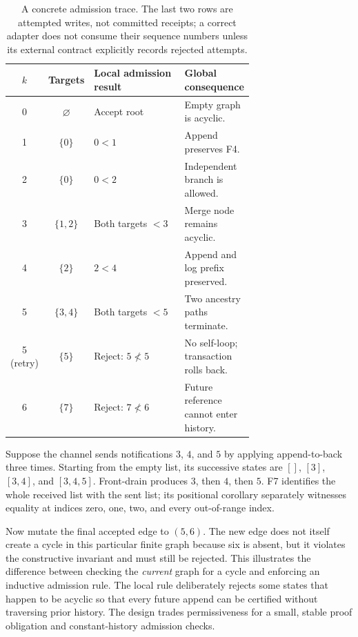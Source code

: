 \documentclass[11pt,letterpaper]{article}
\theoremstyle{definition}
\begin{document}
\begin{table}[h]
\centering
\small
\begin{tabular}{@{}ccp{0.42\linewidth}p{0.28\linewidth}@{}}
\toprule
$k$ & Targets & Local admission result & Global consequence \\
\midrule
0 & $\varnothing$ & Accept root & Empty graph is acyclic. \\
1 & $\{0\}$ & $0<1$ & Append preserves F4. \\
2 & $\{0\}$ & $0<2$ & Independent branch is allowed. \\
3 & $\{1,2\}$ & Both targets $<3$ & Merge node remains acyclic. \\
4 & $\{2\}$ & $2<4$ & Append and log prefix preserved. \\
5 & $\{3,4\}$ & Both targets $<5$ & Two ancestry paths terminate. \\
5 (retry) & $\{5\}$ & Reject: $5\not<5$ & No self-loop; transaction rolls back. \\
6 & $\{7\}$ & Reject: $7\not<6$ & Future reference cannot enter history. \\
\bottomrule
\end{tabular}
\caption{A concrete admission trace. The last two rows are attempted writes,
not committed receipts; a correct adapter does not consume their sequence
numbers unless its external contract explicitly records rejected attempts.}
\label{tab:trace}
\end{table}

Suppose the channel sends notifications $3$, $4$, and $5$ by applying
append-to-back three times. Starting from the empty list, its successive states
are $[]$, $[3]$, $[3,4]$, and $[3,4,5]$. Front-drain produces $3$, then $4$,
then $5$. F7 identifies the whole received list with the sent list; its
positional corollary separately witnesses equality at indices zero, one, two,
and every out-of-range index.

Now mutate the final accepted edge to $(5,6)$. The new edge does not itself
create a cycle in this particular finite graph because six is absent, but it
violates the constructive invariant and must still be rejected. This illustrates
the difference between checking the \emph{current} graph for a cycle and
enforcing an inductive admission rule. The local rule deliberately rejects some
states that happen to be acyclic so that every future append can be certified
without traversing prior history. The design trades permissiveness for a small,
stable proof obligation and constant-history admission checks.
\end{document}
